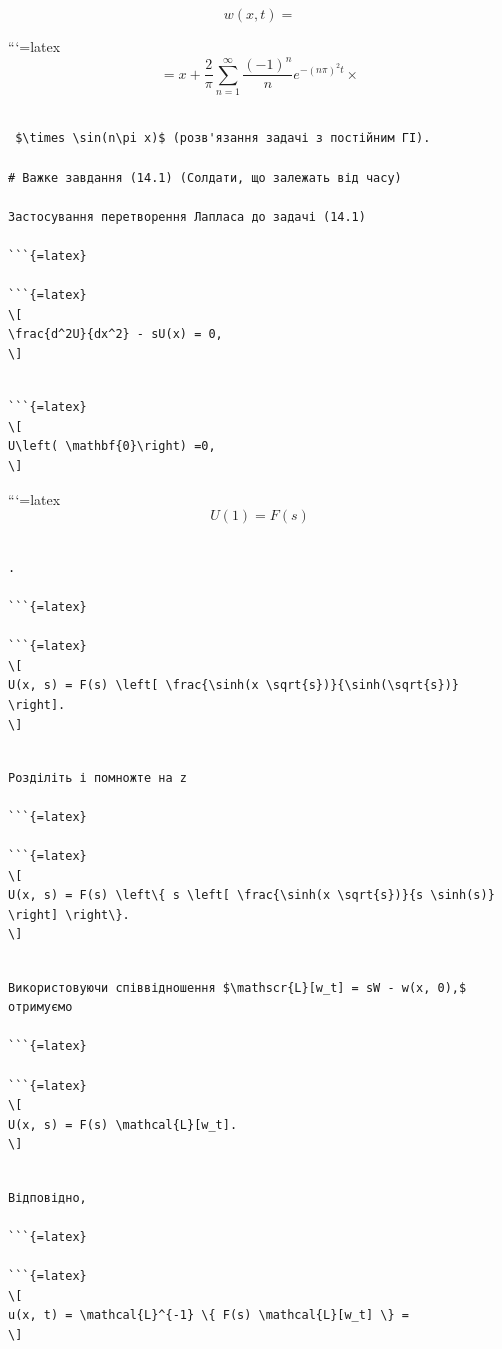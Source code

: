 \documentclass[
]{article}
\begin{document}
\[
w(x, t) =
\]

```{=latex}
\[
= x + \frac{2}{\pi} \sum_{n=1}^{\infty} \frac{(-1)^n}{n} e^{-(n\pi)^2 t} \times
\]

\begin{verbatim}

 $\times \sin(n\pi x)$ (розв'язання задачі з постійним ГІ).

# Важке завдання (14.1) (Солдати, що залежать від часу)

Застосування перетворення Лапласа до задачі (14.1)

```{=latex}

```{=latex}
\[
\frac{d^2U}{dx^2} - sU(x) = 0,
\]
\end{verbatim}

\begin{verbatim}

```{=latex}
\[
U\left( \mathbf{0}\right) =0,
\]
\end{verbatim}

```{=latex}
\[
U(1) = F(s)
\]

\begin{verbatim}

.

```{=latex}

```{=latex}
\[
U(x, s) = F(s) \left[ \frac{\sinh(x \sqrt{s})}{\sinh(\sqrt{s})} \right].
\]
\end{verbatim}

\begin{verbatim}

Розділіть і помножте на z

```{=latex}

```{=latex}
\[
U(x, s) = F(s) \left\{ s \left[ \frac{\sinh(x \sqrt{s})}{s \sinh(s)} \right] \right\}.
\]
\end{verbatim}

\begin{verbatim}

Використовуючи співвідношення $\mathscr{L}[w_t] = sW - w(x, 0),$ отримуємо

```{=latex}

```{=latex}
\[
U(x, s) = F(s) \mathcal{L}[w_t].
\]
\end{verbatim}

\begin{verbatim}

Відповідно,

```{=latex}

```{=latex}
\[
u(x, t) = \mathcal{L}^{-1} \{ F(s) \mathcal{L}[w_t] \} =
\]
\end{verbatim}
\end{document}
